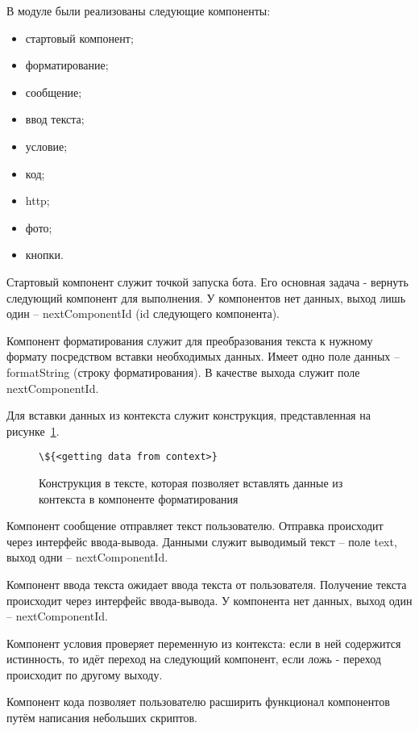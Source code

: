 В модуле были реализованы следующие компоненты:
\begin{itemize}
	\item стартовый компонент;
	\item форматирование;
	\item сообщение;
	\item ввод текста;
	\item условие;
	\item код;
	\item http;
	\item фото;
	\item кнопки.
\end{itemize}


Стартовый компонент служит точкой запуска бота. Его основная задача
- вернуть следующий компонент для выполнения. У компонентов нет данных,
выход лишь один – nextComponentId (id следующего компонента).

Компонент форматирования служит для преобразования текста к
нужному формату посредством вставки необходимых данных. Имеет одно
поле данных – formatString (строку форматирования). В качестве выхода
служит поле nextComponentId.

Для вставки данных из контекста служит
конструкция, представленная на рисунке~\ref{f:format-construct}.


\begin{figure}[ht]
	\centering
	\vspace{\toppaddingoffigure}
	\begin{lstlisting}
\${<getting data from context>}
    \end{lstlisting}
	\caption{Конструкция в тексте, которая позволяет вставлять данные из
		контекста в компоненте форматирования}
	\label{f:format-construct}
\end{figure}


Компонент сообщение отправляет текст пользователю. Отправка
происходит через интерфейс ввода-вывода. Данными служит выводимый
текст – поле text, выход одни – nextComponentId.

Компонент ввода текста ожидает ввода текста от пользователя.
Получение текста происходит через интерфейс ввода-вывода. У компонента
нет данных, выход один – nextComponentId.

Компонент условия проверяет переменную из контекста: если в ней содержится
истинность, то идёт переход на следующий компонент, если ложь - переход происходит
по другому выходу.

Компонент кода позволяет пользователю расширить функционал компонентов путём
написания небольших скриптов.

